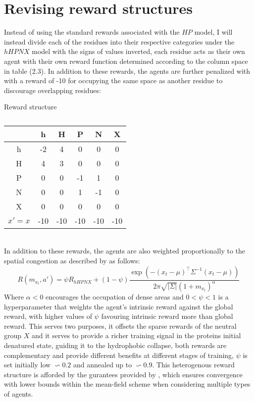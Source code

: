 \section{Revising reward structures}
Instead of using the standard rewards associated with the $HP$ model, 
I will instead divide each of the residues into their respective categories
under the $hHPNX$ model with the signs of values inverted, each residue acts as their own agent with their own
reward function determined according to the column space in table (2.3). In
addition to these rewards, the agents are further penalized with with a reward
of -10 for occupying the same space as another residue to discourage overlapping residues:
\begin{table}[!htb]
    \caption{Reward structure}
    \begin{center}
        \caption{}
        \begin{tabular}{|c || c | c | c | c | c|}
            \hline
             & h & H & P & N & X \\
            \hline
            h & -2 & 4 & 0 & 0 & 0 \\
            \hline
            H & 4 & 3 & 0 & 0 & 0 \\
            \hline
            P & 0 & 0 & -1 & 1 & 0\\
            \hline
            N & 0 & 0 & 1 & -1 & 0\\
            \hline
            X & 0 & 0 & 0 & 0 & 0\\ 
            \hline
            $x' = x$ & -10 & -10 & -10 & -10 & -10\\
            \hline
        \end{tabular}
    \end{center}
\end{table}\\
In addition to these rewards, the agents are also weighted proportionally to 
the spatial congestion as described by \cite{Mguni2018} as follows:
\begin{equation}
    R(m_{x_t},a') = \psi R_{hHPNX} + (1 - \psi)  \frac{\exp (-(x_t - \mu)^\top \Sigma^{-1} (x_t - \mu))}{2 \pi \sqrt{\vert \Sigma \vert}(1 + m_{x_t})^\alpha}
\end{equation}
Where $\alpha < 0$ encourages the occupation of dense areas and $0 < \psi < 1$ is a hyperparameter
that weights the agent's intrinsic reward against the global reward, with higher values
of $\psi$ favouring intrinsic reward more than global reward. This serves two purposes,
it offsets the sparse rewards of the neutral group $X$ and it serves to provide
a richer training signal in the proteins initial denatured state, guiding it to the
hydrophobic collapse, both rewards are complementary and provide different benefits at 
different stages of training, $\psi$ is set initially low $\backsim 0.2$ and annealed up to $\backsim 0.9$.
This heterogenous reward structure is afforded by the gurantees provided by \cite{Sriram2020},
which ensures convergence with lower bounds within the mean-field scheme when considering 
multiple types of agents.                
